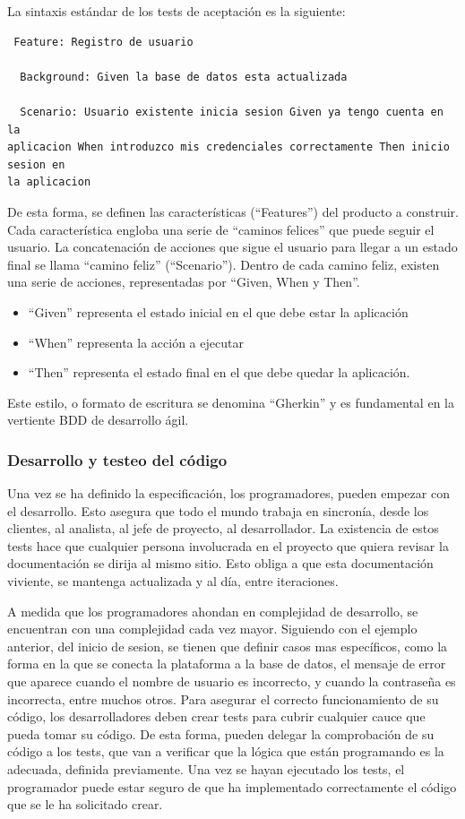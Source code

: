 \documentclass[12pt]{report} %
\begin{document}
La sintaxis estándar de los tests de aceptación es la siguiente:

\begin{lstlisting} Feature: Registro de usuario

  Background: Given la base de datos esta actualizada

  Scenario: Usuario existente inicia sesion Given ya tengo cuenta en la
aplicacion When introduzco mis credenciales correctamente Then inicio sesion en
la aplicacion \end{lstlisting}

De esta forma, se definen las características (``Features'') del producto a
construir.  Cada característica engloba una serie de ``caminos felices'' que
puede seguir el usuario.  La concatenación de acciones que sigue el usuario para
llegar a un estado final se llama ``camino feliz'' (``Scenario'').  Dentro de
cada camino feliz, existen una serie de acciones, representadas por ``Given,
When y Then''.

\begin{itemize} \item{``Given'' representa el estado inicial en el que debe
estar la aplicación} \item{``When'' representa la acción a ejecutar}
\item{``Then'' representa el estado final en el que debe quedar la aplicación.}
\end{itemize}

Este estilo, o formato de escritura se denomina ``Gherkin'' y es fundamental en
la vertiente BDD de desarrollo ágil.

\subsubsection{Desarrollo y testeo del código}

Una vez se ha definido la especificación, los programadores, pueden empezar con
el desarrollo.  Esto asegura que todo el mundo trabaja en sincronía, desde los
clientes, al analista, al jefe de proyecto, al desarrollador.  La existencia de
estos tests hace que cualquier persona involucrada en el proyecto que quiera
revisar la documentación se dirija al mismo sitio.  Esto obliga a que esta
documentación viviente, se mantenga actualizada y al día, entre iteraciones.

A medida que los programadores ahondan en complejidad de desarrollo, se
encuentran con una complejidad cada vez mayor.  Siguiendo con el ejemplo
anterior, del inicio de sesion, se tienen que definir casos mas específicos,
como la forma en la que se conecta la plataforma a la base de datos, el mensaje
de error que aparece cuando el nombre de usuario es incorrecto, y cuando la
contraseña es incorrecta, entre muchos otros.  Para asegurar el correcto
funcionamiento de su código, los desarrolladores deben crear tests para cubrir
cualquier cauce que pueda tomar su código.  De esta forma, pueden delegar la
comprobación de su código a los tests, que van a verificar que la lógica que
están programando es la adecuada, definida previamente.  Una vez se hayan
ejecutado los tests, el programador puede estar seguro de que ha implementado
correctamente el código que se le ha solicitado crear.
\end{document}

